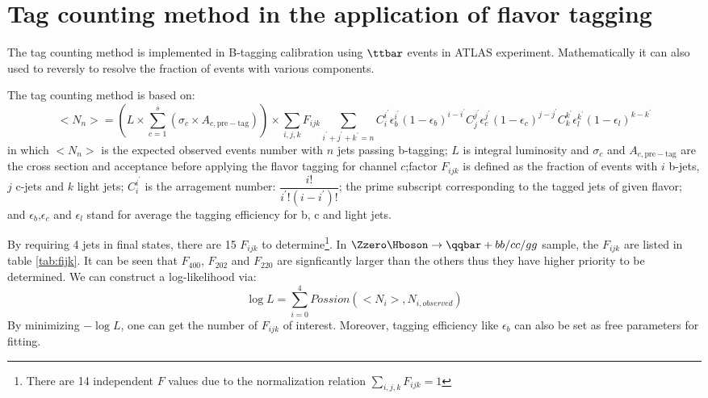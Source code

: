 \section{Tag counting method in the application of flavor tagging}
The tag counting method is implemented in B-tagging calibration using $\ttbar$ events in ATLAS 
experiment\cite{ATLAS_CSC}. Mathematically it can also used to reversly to resolve the fraction of events with various components. \par
The tag counting method is based on:
\begin{equation}\label{for:tagcounting}
<N_n> = (L\times\sum\limits_{c=1}^s(\sigma_c \times A_{c,\mathrm{pre-tag}}))\times\sum\limits_{i,j,k}F_{ijk}\sum\limits_{i^\prime+j^\prime+k^\prime=n}C^{i^\prime}_i\epsilon_b^{i^\prime} (1-\epsilon_b)^{i-i^\prime}C^{j^\prime}_j\epsilon_c^{j^\prime} (1-\epsilon_c)^{j-j^\prime}C^{k^\prime}_k\epsilon_l^{k^\prime} (1-\epsilon_l)^{k-k^\prime}
\end{equation}
in which $<N_n>$ is the expected observed events number with $n$ jets passing b-tagging; $L$ is integral luminosity and $\sigma_c$ and $A_{c,\mathrm{pre-tag}}$ are the cross section and acceptance before applying the flavor tagging for channel $c$;factor $F_{ijk}$ is defined as the fraction of events with $i$ b-jets, $j$ c-jets and $k$ light jets;  $C^{i^\prime}_i$ is the arragement number: $\dfrac{i!}{i^\prime!(i-i^\prime)!}$; the prime subscript corresponding to the tagged jets of given flavor; and $\epsilon_b$,$\epsilon_c$ and $\epsilon_l$ stand for average the tagging efficiency for b, c and light jets.\par
By requiring 4 jets in final states, there are 15 $F_{ijk}$ to determine\footnote{There are 14 independent $F$ values due to the normalization relation $\sum\limits_{i,j,k}F_{ijk}=1$}. In $\Zzero\Hboson\to \qqbar + bb/cc/gg$ sample, the $F_{ijk}$ are listed in table \ref{tab:fijk}. It can be seen that $F_{400}$, $F_{202}$ and $F_{220}$ are signficantly larger than the others thus they have higher priority to be determined.  We can construct a log-likelihood via:
\begin{equation}\label{for:tagcounting_likelihood}
\log{L} = \sum\limits_{i=0}^4 Possion(<N_i>,N_{i,observed})
\end{equation}
By minimizing $-\log{L}$, one can get the number of $F_{ijk}$ of interest. Moreover, tagging efficiency like $\epsilon_b$ can also be set as free parameters for fitting.

